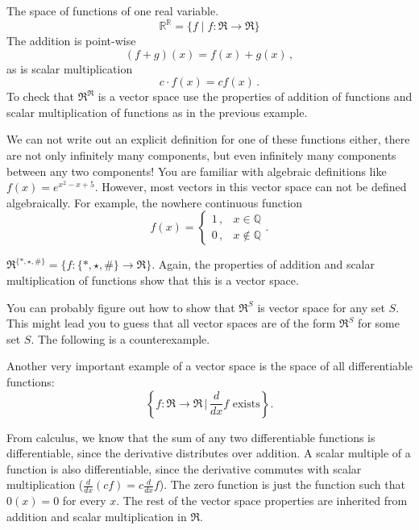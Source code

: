 \begin{example} The space of functions of one real variable.\\
\[ \mathbb{R}^\mathbb{R} = \{f \mid f \colon \Re \to \Re \} \]
The addition is point-wise \[(f+g)(x)=f(x)+g(x)\, ,\] as is scalar multiplication \[c\cdot f(x)=cf(x)\, .\]  
To check that $\Re^\Re$ is a vector space use the properties of addition of functions and scalar multiplication of functions as in the previous example. 


We can not write out an explicit definition for one of these functions either, there are not only infinitely many components, but even infinitely many components between any two components!  
You are familiar with algebraic definitions like $f(x)=e^{x^2-x+5}$. However, most vectors in this vector space can not be defined algebraically. For example, the nowhere continuous function 
\begin{displaymath}
   f(x) = \left\{
     \begin{array}{lr}
       1\, , & x \in \mathbb{Q}\\[2mm]
       0\, , &  x \notin \mathbb{Q}
     \end{array}
   \right. .
\end{displaymath} 
\end{example}

\begin{example} $\Re^{ \{*, \star, \# \}} = \{ f : \{*, \star, \# \} \to \Re \}$. Again, the properties of addition and scalar multiplication of functions show that this is a vector space.
\end{example}

You can probably figure out how to show that $\Re^S$ is vector space for any set $S$.  
This might lead you to guess that all vector spaces are of the form $\Re^S$ for some set $S$. The following is a counterexample. 

\begin{example}
Another very important example of a vector space is the space of all differentiable functions: 
\[
\left\{ f \colon \Re\rightarrow \Re \, \Big|\, \frac{d}{dx}f \text{ exists} \right\}.
\]

From calculus, we know that the sum of any two differentiable functions is differentiable, since the derivative distributes over addition.  A scalar multiple of a function is also differentiable, since the derivative commutes with scalar multiplication ($\frac{d}{d x}(cf)=c\frac{d}{dx}f$).  The zero function is just the function such that $0(x)=0$ for every $x$.  The rest of the vector space properties are inherited from addition and scalar multiplication in $\Re$.
\end{example}

